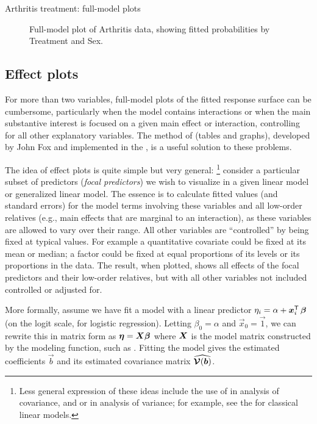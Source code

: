 \documentclass[11pt]{book}\usepackage[]{graphicx}\usepackage[]{color}
\newenvironment{knitrout}{}{} %
\renewenvironment{knitrout}{\small\renewcommand{\baselinestretch}{.85}}{} %
\begin{document}
\begin{Example}{Arthritis treatment: full-model plots}
\begin{knitrout}
\begin{figure}[!htbp]
\caption[Full-model plot of Arthritis data, showing fitted probabilities by Treatment and Sex]{Full-model plot of Arthritis data, showing fitted probabilities by Treatment and Sex.\label{fig:arth-full2}}
\end{figure}


\end{knitrout}

\end{Example}

\subsection{Effect plots}\label{sec:logist-effplots}
For more than two variables, full-model plots of the fitted response surface can
be cumbersome, particularly when the model contains interactions or when the main
substantive interest is focused on a given main effect or interaction, controlling
for all other explanatory variables.
The method of  (tables and graphs), developed by
John Fox \citeyearpar{Fox:87,Fox:03:effects} and implemented in the ,
is a useful solution to these problems.

The idea of effect plots is quite simple but very general:%
\footnote{
Less general expression of these ideas include the use of 
in analysis of covariance, and  
or  \citep{Searle-etal:80}
in analysis of variance; for example, see the  for classical linear models.
}
consider a particular
subset of predictors (\emph{focal predictors}) we wish to visualize in a given
linear model or generalized linear model.  The essence is to calculate fitted
values (and standard errors) for the model terms involving these variables
and all low-order relatives (e.g., main effects that are marginal to an interaction),
as these variables are allowed to vary over their range.  All other variables
are ``controlled'' by being fixed at typical values. For example a quantitative
covariate could be fixed at its mean or median; a factor could be fixed at
equal proportions of its levels or its proportions in the data.
The result, when plotted, shows all effects of the focal predictors and their
low-order relatives, but with all other variables not included controlled or
adjusted for.

More formally, assume we have fit a model with a linear predictor
$\eta_i =  \alpha + \bm{x}_{i}^\mathsf{T} \,  \bm{\beta} $ 
(on the logit scale, for logistic regression).
Letting $\beta_0 = \alpha$ and $\vec{x}_0 = \vec{1}$, we can rewrite this
in matrix form as $\bm{\eta} = \bm{X} \bm{\beta}$ where $\bm{X}$ is
the model matrix constructed by the modeling function, such as .
Fitting the model gives the estimated coefficients $\vec{b}$ and
its estimated covariance matrix $\widehat{\bm{\mathcal{V}} (\bm{b})}$.
\end{document}
